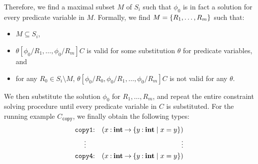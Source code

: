 Therefore, we find a maximal subset \(M\) of \(S_i\) such that \(\phi_0\) 
is in fact a solution for every predicate variable in \(M\).  Formally, 
we find \(M=\{{R_1,\dots,R_m}\}\) such that:
\begin{itemize}
\item \(M \subseteq S_i\),
\item \(\theta[\phi_0/R_1,\dots,\phi_0/R_m]C\) is valid for some 
substitution \(\theta\) for predicate variables, and
\item for any \(R_0 \in S_i \setminus M\), 
\(\theta[\phi_0/R_0,\phi_0/R_1,\dots,\phi_0/R_m]C\) is not valid for any 
\(\theta\).
\end{itemize}

We then substitute the solution \(\phi_0\) for \(R_1,\dots,R_m\), and 
repeat the entire constraint solving procedure until every predicate 
variable in \(C\) is substituted.  For the running example 
\(C_{\texttt{copy}}\), we finally obtain the following types:
\begin{eqnarray*}
\texttt{copy1}&\mathbin{:}&(x\mathbin{:}{\mathbf{int}}\mathbin{\rightarrow}{\{{y\mathbin{:}\mathbf{int} \mid x=y}\}}) \\
\vdots\quad &&\qquad\qquad \vdots \\
\texttt{copy4}&\mathbin{:}&(x\mathbin{:}{\mathbf{int}}\mathbin{\rightarrow}{\{{y\mathbin{:}\mathbf{int} \mid x=y}\}})
\end{eqnarray*}


%
